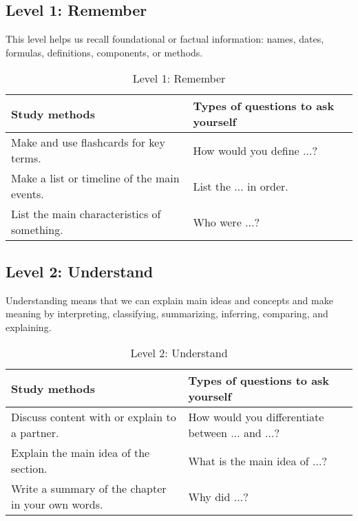 \documentclass[../main.tex]{subfiles}
\begin{document}
\subsection{Level 1: Remember}
This level helps us recall foundational or factual information: names, dates,
formulas, definitions, components, or methods.
%
\begin{table}[H]
  \begin{center}
    \begin{tabular}[c]{p{6cm}p{6cm}}
      \hline
      Study methods & Types of questions to ask yourself \\
      \hline
      Make and use flashcards for key terms. & How would you define $ \ldots $?
      \\
      Make a list or timeline of the main events. & List the $ \ldots $ in
      order. \\
      List the main characteristics of something. & Who were $ \ldots $? \\
      \hline
    \end{tabular}
    \caption{Level 1: Remember}
  \end{center}
\end{table}
%
\subsection{Level 2: Understand}
Understanding means that we can explain main ideas and concepts and make meaning
by interpreting, classifying, summarizing, inferring, comparing, and explaining.
%
\begin{table}[H]
  \begin{center}
    \begin{tabular}[c]{p{6cm}p{6cm}}
      \hline
      Study methods & Types of questions to ask yourself \\
      \hline
      Discuss content with or explain to a partner. & How would you
      differentiate between $ \ldots $ and $ \ldots $? \\
      Explain the main idea of the section. & What is the main idea of $ \ldots
      $? \\
      Write a summary of the chapter in your own words. & Why did $ \ldots $? \\
      \hline
    \end{tabular}
    \caption{Level 2: Understand}
  \end{center}
\end{table}
%
\end{document}
